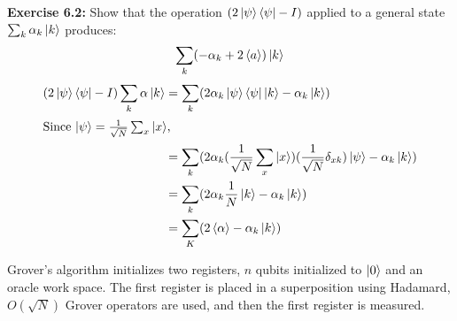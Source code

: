 \documentclass{article}
\begin{document}
\begin{tcolorbox}\textbf{Exercise 6.2:} Show that the operation $(2\ket{\psi} \bra{\psi} - I)$ applied to a general state $\sum_k \alpha_k \ket{k}$ produces:
	$$\sum_k (-\alpha_k + 2 \braket{a}) \ket{k}$$
	\begin{align*}
		(2\ket{\psi}\bra{\psi} - I)\sum_k \alpha \ket{k} &= \sum_k (2\alpha_k\ket{\psi} \bra{\psi}\ket{k} - \alpha_k  \ket{k})\\
		\intertext{Since $\ket{\psi} = \frac{1}{\sqrt{N}}\sum_x\ket{x}$,}
								 &= \sum_k (2\alpha_k (\frac{1}{\sqrt{N}}\sum_x \ket{x})(\frac{1}{\sqrt{N}} \delta_{xk})  \ket{\psi} - \alpha_k \ket{k})\\
								 &= \sum_k (2\alpha_k \frac{1}{N} \ket{k} - \alpha_k \ket{k}) \\
								 &= \sum_K (2\braket{\alpha} - \alpha_k \ket{k}) 
	\end{align*}
\end{tcolorbox}
Grover's algorithm initializes two registers, $n$ qubits initialized to $\ket0$ and an oracle work space. The first register is placed in a superposition using Hadamard, $O(\sqrt{N})$ Grover operators are used, and then the first register is measured.
\end{document}

